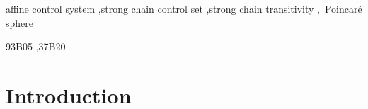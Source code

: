 \documentclass[preprint,12pt]{elsarticle}
\begin{document}
\begin{frontmatter}


\begin{keyword}
affine control system \sep strong chain control set \sep strong
chain transitivity \sep \ Poincar\'{e} sphere


93B05 \sep 37B20

\end{keyword}

\end{frontmatter}



\section{Introduction}
\end{document}
